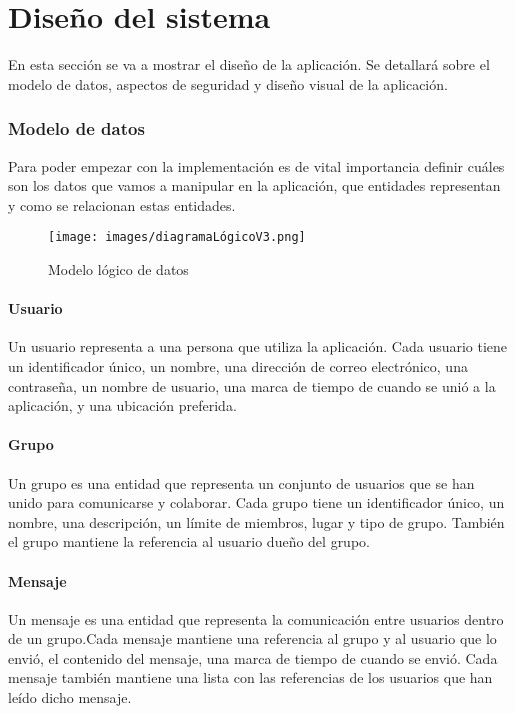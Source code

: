 \chapter{Diseño del sistema}
En esta sección se va a mostrar el diseño de la aplicación. Se detallará sobre el modelo de datos, aspectos de seguridad y diseño visual de la aplicación.

\subsection{Modelo de datos}
Para poder empezar con la implementación es de vital importancia definir cuáles son los datos que vamos a manipular en la aplicación, que entidades representan y como se relacionan estas entidades.

    \begin{figure}[H]
        \centering
        \texttt{[image: images/diagramaLógicoV3.png]}
        \caption{Modelo lógico de datos}
        \label{fig:diagramaER}
    \end{figure}

\subsubsection{Usuario}
Un usuario representa a una persona que utiliza la aplicación. Cada usuario tiene un identificador único, un nombre, una dirección de correo electrónico, una contraseña, un nombre de usuario, una marca de tiempo de cuando se unió a la aplicación, y una ubicación preferida.

\subsubsection{Grupo}
Un grupo es una entidad que representa un conjunto de usuarios que se han unido para comunicarse y colaborar. Cada grupo tiene un identificador único, un nombre, una descripción, un límite de miembros, lugar y tipo de grupo. También el grupo mantiene la referencia al usuario dueño del grupo.

\subsubsection{Mensaje}
Un mensaje es una entidad que representa la comunicación entre usuarios dentro de un grupo.Cada mensaje mantiene una referencia al grupo y al usuario que lo envió, el contenido del mensaje, una marca de tiempo de cuando se envió. Cada mensaje también mantiene una lista con las referencias de los usuarios que han leído dicho mensaje.

